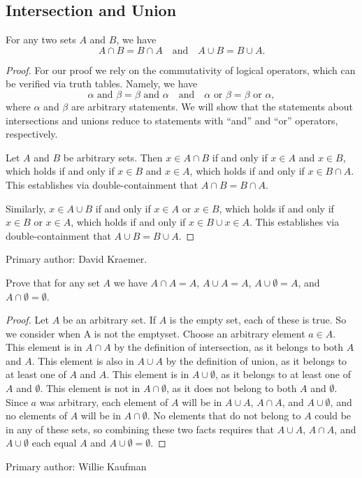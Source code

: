\subsection{Intersection and Union}%

\begin{majorEx} %
    [Commutativity of $\cap$ and $\cup$]
    For any two sets $A$ and $B$, we have
    \[
        A \cap B = B \cap A \quad \text{and} \quad A \cup B = B \cup A.
    \]
\end{majorEx}

\begin{proof}
    For our proof we rely on the commutativity of logical operators, which can
    be verified via truth tables. Namely, we have
    \[
        \alpha \text{ and } \beta = \beta \text{ and } \alpha \quad \text{and}
        \quad \alpha \text{ or } \beta = \beta \text{ or } \alpha, 
    \]
    where $\alpha$ and $\beta$ are arbitrary statements. We will show that the
    statements about intersections and unions reduce to statements with ``and''
    and ``or'' operators, respectively.

    Let $A$ and $B$ be arbitrary sets. Then $x \in A \cap B$ if and only if $x
    \in A$ and $x \in B$, which holds if and only if $x \in B$ and $x \in A$,
    which holds if and only if $x \in B \cap A$. This establishes via
    double-containment that $A \cap B = B \cap A$.

    Similarly, $x \in A \cup B$ if and only if $x \in A$ or $x \in B$, which
    holds if and only if $x \in B$ or $x \in A$, which holds if and only if $x
    \in B \cup x \in A$. This establishes via double-containment that $A \cup B
    = B \cup A$.
\end{proof}

Primary author: David Kraemer.

\begin{minorEx}%
    Prove that for any set $A$ we have $ A \cap A = A$, $A \cup A = A$, $A \cup
    \emptyset = A$, and $A \cap \emptyset = \emptyset$.
\end{minorEx}

\begin{proof}
    Let $A$ be an arbitrary set. If $A$ is the empty set, each of these is
    true. So we consider when A is not the emptyset. Choose an arbitrary
    element $a \in A$. This element is in $A \cap A$ by the definition of
    intersection, as it belongs to both $A$ and $A$. This element is also in
    $A \cup A$ by the definition of union, as it belongs to at least one of
    $A$ and $A$. This element is in $A \cup \emptyset$, as it belongs to at
    least one of $A$ and $\emptyset$. This element is not in $A \cap
    \emptyset$, as it does not belong to both $A$ and $\emptyset$. Since $a$
    was arbitrary, each element of $A$ will be in $A \cup A$, $A \cap A$,
    and $A \cup \emptyset$, and no elements of $A$ will be in $A \cap
    \emptyset$. No elements that do not belong to $A$ could be in any of
    these sets, so combining these two facts requires that $A \cup A$, $A
    \cap A$, and $A \cup \emptyset$ each equal $A$ and $A \cup \emptyset =
    \emptyset$.
\end{proof}
Primary author: Willie Kaufman

